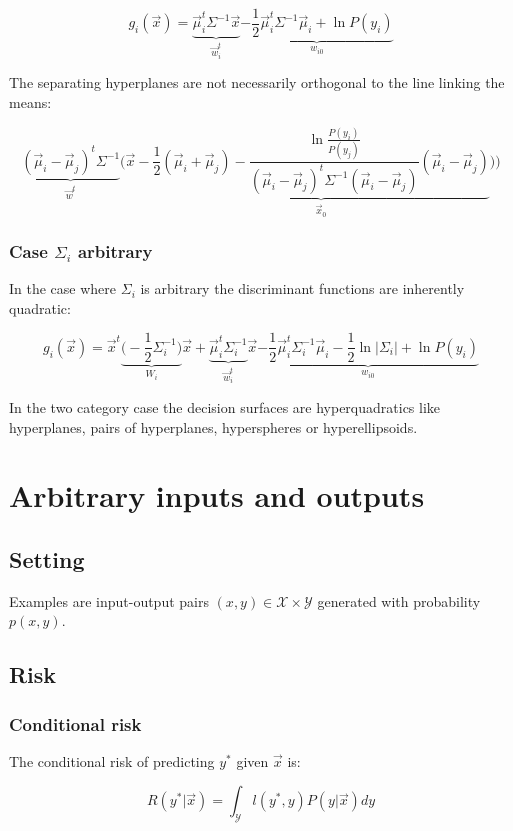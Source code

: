 		$$g_i(\vec{x}) = \underbrace{\vec{\mu}_i^t\Sigma^{-1}\vec{x}}_{\vec{w}_i^t} \underbrace{-\frac{1}{2}\vec{\mu}_i^t\Sigma^{-1}\vec{\mu}_i + \ln P(y_i)}_{w_{i0}}$$

		The separating hyperplanes are not necessarily orthogonal to the line linking the means:

		$$\underbrace{(\vec{\mu}_i - \vec{\mu}_j)^t\Sigma^{-1}}_{\vec{w}^t}\biggl(\vec{x}-\underbrace{\frac{1}{2}(\vec{\mu}_i+\vec{\mu}_j) - \frac{\ln \frac{P(y_i)}{P(y_j)}}{(\vec{\mu}_i - \vec{\mu}_j)^t\Sigma^{-1}(\vec{\mu}_i-\vec{\mu}_j)}(\vec{\mu}_i-\vec{\mu}_j)}_{\vec{x}_0}\biggr))$$

		\subsubsection{Case $\Sigma_i$ arbitrary}
		In the case where $\Sigma_i$ is arbitrary the discriminant functions are inherently quadratic:

		$$g_i(\vec{x}) = \vec{x}^t\underbrace{\biggl(-\frac{1}{2}\Sigma^{-1}_i\biggr)}_{W_i}\vec{x} + \underbrace{\vec{\mu}_i^t\Sigma_i^{-1}}_{\vec{w}_i^t}\vec{x} \underbrace{-\frac{1}{2}\vec{\mu}_i^t\Sigma_i^{-1}\vec{\mu}_i - \frac{1}{2}\ln|\Sigma_i| + \ln P(y_i)}_{w_{i0}}$$

		In the two category case the decision surfaces are hyperquadratics like hyperplanes, pairs of hyperplanes, hyperspheres or hyperellipsoids.

\section{Arbitrary inputs and outputs}

	\subsection{Setting}
	Examples are input-output pairs $(x, y)\in\mathcal{X}\times\mathcal{Y}$ generated with probability $p(x, y)$.

	\subsection{Risk}

		\subsubsection{Conditional risk}
		The conditional risk of predicting $y^*$ given $\vec{x}$ is:

		$$R(y^*|\vec{x}) = \int_\mathcal{Y}l(y^*, y)P(y|\vec{x})dy$$

